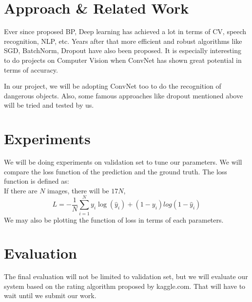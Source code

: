 \documentclass[conference,compsoc]{IEEEtran}
\begin{document}
\section{Approach \& Related Work}
	\par
	Ever since \cite{hinton2006fast} proposed BP, Deep learning has achieved a lot in terms of CV, speech recognition, NLP, etc. 
	Years after that more efficient and robust algorithms like SGD\cite{bottou2010large, lecun2012efficient}, BatchNorm\cite{ioffe2015batch}, Dropout\cite{hinton2012improving, srivastava2014dropout} have also been proposed. It is especially interesting to do projects on Computer Vision when ConvNet\cite{krizhevsky2012imagenet} has shown great potential in terms of accuracy.
	\par
	In our project, we will be adopting ConvNet too to do the recognition of dangerous objects. Also, some famous approaches like dropout mentioned above will be tried and tested by us.
\section{Experiments}
	We will be doing experiments on validation set to tune our parameters. We will compare the loss function of the prediction and the ground truth. The loss function is defined as: \\
	If there are $N$ images, there will be $17N$,
	$$ L = -\frac{1}{N}\sum_{i=1}^N{y_i\log(\hat{y}_i) + (1-y_i)log(1-\hat{y}_i)}$$
	We may also be plotting the function of loss in terms of each parameters.
\section{Evaluation}
	The final evaluation will not be limited to validation set, but we will evaluate our system based on the rating algorithm proposed by kaggle.com. That will have to wait until we submit our work.





\end{document}
